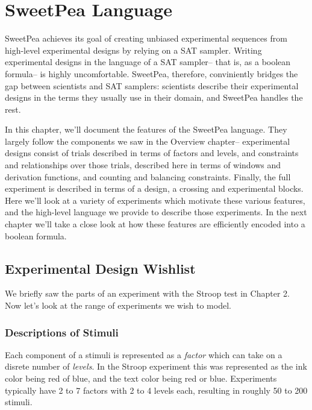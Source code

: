 
\chapter{SweetPea Language}

SweetPea achieves its goal of creating unbiased experimental sequences from high-level experimental designs by relying on a SAT sampler. Writing experimental designs in the language of a SAT sampler-- that is, as a boolean formula-- is highly uncomfortable. SweetPea, therefore, conviniently bridges the gap between scientists and SAT samplers: scientists describe their experimental designs in the terms they usually use in their domain, and SweetPea handles the rest.

In this chapter, we'll document the features of the SweetPea language. They largely follow the components we saw in the Overview chapter-- experimental designs consist of trials described in terms of factors and levels, and constraints and relationships over those trials, described here in terms of windows and derivation functions, and counting and balancing constraints. Finally, the full experiment is described in terms of a design, a crossing and experimental blocks. Here we'll look at a variety of experiments which motivate these various features, and the high-level language we provide to describe those experiments. In the next chapter we'll take a close look at how these features are efficiently encoded into a boolean formula.


\section{Experimental Design Wishlist}

We briefly saw the parts of an experiment with the Stroop test in Chapter 2. Now let's look at the range of experiments we wish to model.

\subsection{Descriptions of Stimuli}

Each component of a stimuli is represented as a \emph{factor} which can take on a disrete number of \emph{levels}. In the Stroop experiment this was represented as the ink color being red of blue, and the text color being red or blue. Experiments typically have 2 to 7 factors with 2 to 4 levels each, resulting in roughly 50 to 200 stimuli.

